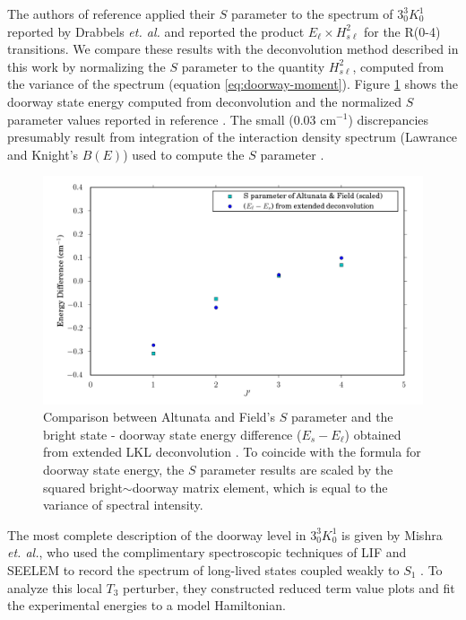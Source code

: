 \documentclass[12pt]{mitthesis}
\begin{document}
The authors of reference \cite{altunata01} applied their $S$ parameter
to the spectrum of $3^3_0K^1_0$ reported by Drabbels \emph{et. al.}
and reported the product $E_{\ell} \times H_{s\ell}^2$ for the R(0-4)
transitions.  We compare these results with the deconvolution method
described in this work by normalizing the $S$ parameter to the
quantity $H_{s\ell}^2$, computed from the variance of the spectrum
(equation \ref{eq:doorway-moment}).  Figure \ref{fig:selen-comparison}
shows the doorway state energy computed from deconvolution and the
normalized $S$ parameter values reported in reference
\cite{altunata01}.  The small (0.03 cm$^{-1}$) discrepancies
presumably result from integration of the interaction density spectrum
(Lawrance and Knight's $B(E)$) used to compute the $S$ parameter
\cite{lawrance85}.

\begin{figure}
  \caption{Comparison between Altunata and Field's $S$ parameter and
    the bright state - doorway state energy difference ($E_s -
    E_{\ell}$) obtained from extended LKL deconvolution
    \cite{altunata01}.  To coincide with the formula for doorway state
    energy, the $S$ parameter results are scaled by the squared
    bright$\sim$doorway matrix element, which is equal to the variance
    of spectral intensity.}
  \label{fig:selen-comparison}
  \centering
  \includegraphics[width=6.5in]{selen-comparison.png}
\end{figure}

The most complete description of the doorway level in $3^3_0K^1_0$ is
given by Mishra \emph{et. al.}, who used the complimentary
spectroscopic techniques of LIF and SEELEM to record the spectrum of
long-lived states coupled weakly to $S_1$ \cite{mishra04}.  To analyze
this local $T_3$ perturber, they constructed reduced term value plots
and fit the experimental energies to a model Hamiltonian.
\end{document}
